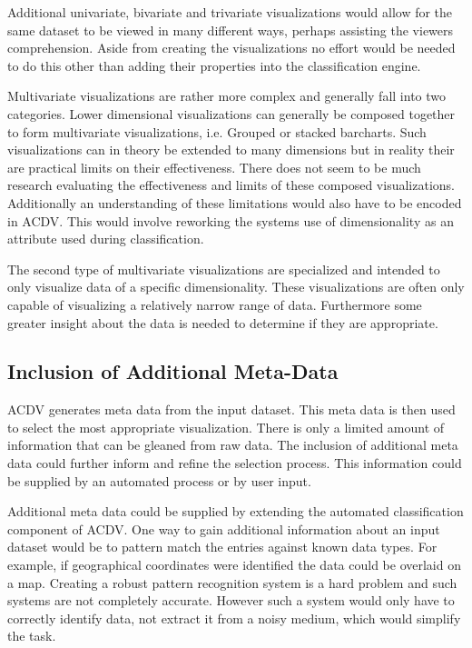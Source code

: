 \documentclass[a4paper, 11pt, titlepage, onehalfspacing]{report}
\begin{document}
Additional univariate, bivariate and trivariate visualizations would allow for the same dataset to be viewed in many different ways, perhaps assisting the viewers comprehension. Aside from creating the visualizations no effort would be needed to do this other than adding their properties into the classification engine.

Multivariate visualizations are rather more complex and generally fall into two categories. Lower dimensional visualizations can generally be composed together to form multivariate visualizations, i.e. Grouped or stacked barcharts. Such visualizations can in theory be extended to many dimensions but in reality their are practical limits on their effectiveness. There does not seem to be much research evaluating the effectiveness and limits of these composed visualizations. Additionally an understanding of these limitations would also have to be encoded in AC\lightning{}DV. This would involve reworking the systems use of dimensionality as an attribute used during classification.

The second type of multivariate visualizations are specialized and intended to only visualize data of a specific dimensionality. These visualizations are often only capable of visualizing a relatively narrow range of data. Furthermore some greater insight about the data is needed to determine if they are appropriate.

\subsection{Inclusion of Additional Meta-Data}
AC\lightning{}DV generates meta data from the input dataset. This meta data is then used to select the most appropriate visualization. There is only a limited amount of information that can be gleaned from raw data. The inclusion of additional meta data could further inform and refine the selection process. This information could be supplied by an automated process or by user input.

Additional meta data could be supplied by extending the automated classification component of AC\lightning{}DV. One way to gain additional information about an input dataset would be to pattern match the entries against known data types. For example, if geographical coordinates were identified the data could be overlaid on a map. Creating a robust pattern recognition system is a hard problem and such systems are not completely accurate. However such a system would only have to correctly identify data, not extract it from a noisy medium, which would simplify the task.
\end{document}
